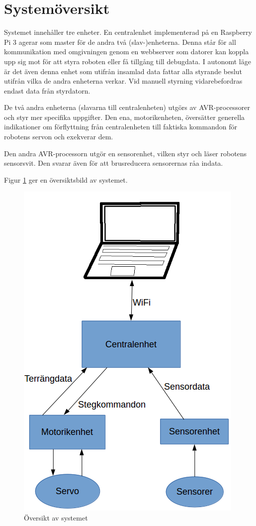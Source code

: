\documentclass[a4paper,titlepage,12pt]{article}
\begin{document}

	\section{Systemöversikt}
	Systemet innehåller tre enheter. En centralenhet implementerad på en Raspberry Pi 3 
	agerar som master för de andra två (slav-)enheterna. Denna står för all kommunikation 
	med omgivningen genom en webbserver som datorer kan koppla upp sig mot för att styra roboten 
	eller få tillgång till debugdata. I autonomt läge är det även denna enhet som utifrån 
	insamlad data fattar alla styrande beslut utifrån vilka de andra enheterna 
	verkar. Vid manuell styrning vidarebefordras endast data från styrdatorn.

	De två andra enheterna (slavarna till centralenheten) utgörs av AVR-processorer och styr 
	mer specifika uppgifter. Den ena, motorikenheten, översätter generella indikationer om 
	förflyttning från centralenheten till faktiska kommandon för robotens
    servon och exekverar dem.
    
    Den andra AVR-processorn utgör en sensorenhet, vilken styr och läser
    robotens sensorsvit.  Den svarar även för att brusreducera sensorernas råa indata. 
    
    Figur \ref{fig:overview} ger en översiktsbild av systemet.
	
	\begin{figure}[h!]
		\centering
		\includegraphics[width=0.5\linewidth]{../images/overview.png}
		\caption{Översikt av systemet\label{fig:overview}}
	\end{figure}
\end{document}
